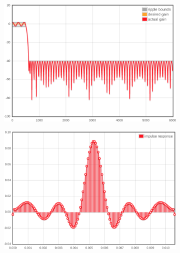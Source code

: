\begin{figure}[h]
	\centering
	\begin{subfigure}{.5\textwidth}
	  \centering
	  \includegraphics[width=0.9\linewidth]{img/filter1_gain.png}
	  \caption{}
	  \label{fig:opq:4:1}
	\end{subfigure}%
	\begin{subfigure}{.5\textwidth}
	  \centering
	  \includegraphics[width=0.9\linewidth]{img/filter1_response.png}
	  \caption{}
	  \label{fig:opq:4:2}
	\end{subfigure}


\end{figure}
